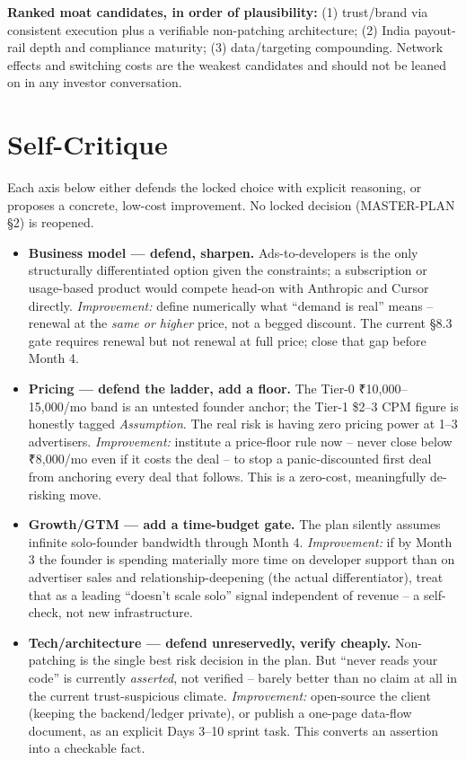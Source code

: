 \textbf{Ranked moat candidates, in order of plausibility:} (1) trust/brand via consistent execution plus a verifiable non-patching architecture; (2) India payout-rail depth and compliance maturity; (3) data/targeting compounding. Network effects and switching costs are the weakest candidates and should not be leaned on in any investor conversation.

\section{Self-Critique}
\label{sec:self-critique}

Each axis below either defends the locked choice with explicit reasoning, or proposes a concrete, low-cost improvement. No locked decision (MASTER-PLAN \S2) is reopened.

\begin{itemize}
  \item \textbf{Business model --- defend, sharpen.} Ads-to-developers is the only structurally differentiated option given the constraints; a subscription or usage-based product would compete head-on with Anthropic and Cursor directly. \textit{Improvement:} define numerically what ``demand is real'' means -- renewal at the \emph{same or higher} price, not a begged discount. The current \S8.3 gate requires renewal but not renewal at full price; close that gap before Month 4.
  \item \textbf{Pricing --- defend the ladder, add a floor.} The Tier-0 ₹10,000--15,000/mo band is an untested founder anchor; the Tier-1 \$2--3 CPM figure is honestly tagged \emph{Assumption}. The real risk is having zero pricing power at 1--3 advertisers. \textit{Improvement:} institute a price-floor rule now -- never close below ₹8,000/mo even if it costs the deal -- to stop a panic-discounted first deal from anchoring every deal that follows. This is a zero-cost, meaningfully de-risking move.
  \item \textbf{Growth/GTM --- add a time-budget gate.} The plan silently assumes infinite solo-founder bandwidth through Month 4. \textit{Improvement:} if by Month 3 the founder is spending materially more time on developer support than on advertiser sales and relationship-deepening (the actual differentiator), treat that as a leading ``doesn't scale solo'' signal independent of revenue -- a self-check, not new infrastructure.
  \item \textbf{Tech/architecture --- defend unreservedly, verify cheaply.} Non-patching is the single best risk decision in the plan. But ``never reads your code'' is currently \emph{asserted}, not verified -- barely better than no claim at all in the current trust-suspicious climate. \textit{Improvement:} open-source the client (keeping the backend/ledger private), or publish a one-page data-flow document, as an explicit Days 3--10 sprint task. This converts an assertion into a checkable fact.

\end{itemize}
